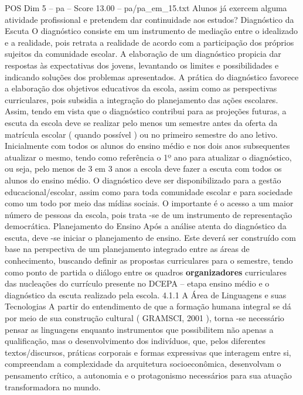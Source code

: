 \begin{textsample}{POS Dim 5 – pa – Score 13.00 – pa/pa\_em\_15.txt}  \label{ex:f5_pos_241}
Alunos já exercem alguma atividade profissional e pretendem dar continuidade aos estudos?
Diagnóstico da Escuta O diagnóstico consiste em um instrumento de mediação entre o idealizado e a realidade, pois retrata a realidade de acordo com a participação dos próprios sujeitos da comunidade escolar.
A elaboração de um diagnóstico propicia dar respostas às expectativas dos jovens, levantando os limites e possibilidades e indicando soluções dos problemas apresentados.
A prática do diagnóstico favorece a elaboração dos objetivos educativos da escola, assim como as perspectivas curriculares, pois subsidia a integração do planejamento das ações escolares.
Assim, tendo em vista que o diagnóstico contribui para as projeções futuras, a escuta da escola deve se realizar pelo menos um semestre antes da oferta da matrícula escolar ( quando possível ) ou no primeiro semestre do ano letivo.
Inicialmente com todos os alunos do ensino médio e nos dois anos subsequentes atualizar o mesmo, tendo como referência o 1º ano para atualizar o diagnóstico, ou seja, pelo menos de 3 em 3 anos a escola deve fazer a escuta com todos os alunos do ensino médio.
O diagnóstico deve ser disponibilizado para a gestão educacional/escolar, assim como para toda comunidade escolar e para sociedade como um todo por meio das mídias sociais.
O importante é o acesso a um maior número de pessoas da escola, pois trata -se de um instrumento de representação democrática.
Planejamento do Ensino Após a análise atenta do diagnóstico da escuta, deve -se iniciar o planejamento de ensino.
Este deverá ser construído com base na perspectiva de um planejamento integrado entre as áreas de conhecimento, buscando definir as propostas curriculares para o semestre, tendo como ponto de partida o diálogo entre os quadros \textbf{organizadores} curriculares das nucleações do currículo presente no DCEPA – etapa ensino médio e o diagnóstico da escuta realizado pela escola. 4.1.1 A Área de Linguagens e suas Tecnologias A partir do entendimento de que a formação humana integral se dá por meio de sua construção cultural ( GRAMSCI, 2001 ), torna -se necessário pensar as linguagens enquanto instrumentos que possibilitem não apenas a qualificação, mas o desenvolvimento dos indivíduos, que, pelos diferentes textos/discursos, práticas corporais e formas expressivas que interagem entre si, compreendam a complexidade da arquitetura socioeconômica, desenvolvam o pensamento crítico, a autonomia e o protagonismo necessários para sua atuação transformadora no mundo.

\end{textsample}
